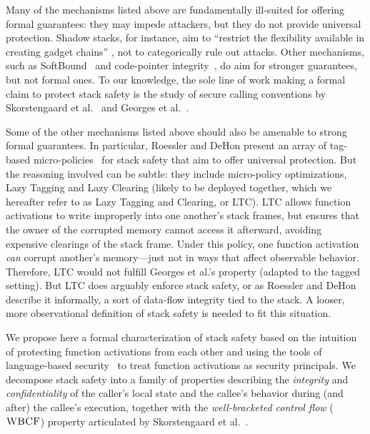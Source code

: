 \documentclass[10pt,conference]{ieeetran}%
\theoremstyle{definition}
\begin{document}
Many of the mechanisms listed above are fundamentally ill-suited for
offering formal guarantees: they may impede attackers, but they do not provide
universal protection. Shadow stacks, for instance, aim to ``restrict
the flexibility available in creating gadget chains''
\cite{Shanbhogue+19}, not to categorically rule out attacks. Other
mechanisms, such as SoftBound~\cite{NagarakatteZMZ09} and code-pointer
integrity~\cite{Kuznetsov+14}, do aim for stronger guarantees, but not
formal ones.  To our knowledge, the sole
line of work making a formal claim to protect stack safety is the
study of secure calling conventions by Skorstengaard et
al.~\cite{SkorstengaardSTKJFP} and Georges et
al.~\cite{Georges22:TempsDesCerises}.

Some of the other mechanisms listed above should also be amenable to strong
formal guarantees.  In particular, Roessler and DeHon
\cite{DBLP:conf/sp/RoesslerD18} present an array of tag-based
micro-policies~\cite{pump_oakland2015} for stack safety that aim to offer
universal protection.  But the reasoning involved can be subtle:
they include micro-policy optimizations, Lazy Tagging and Lazy Clearing
(likely to be deployed together, which we hereafter refer to as Lazy
Tagging and Clearing, or LTC). LTC allows function activations to write
improperly into one another's stack frames, but ensures that the owner of
the corrupted memory cannot access it afterward, avoiding expensive
clearings of the stack frame.
%
Under this policy, one function activation {\em can} corrupt another's
memory---just not in ways that affect observable behavior.
Therefore, LTC would not fulfill Georges et al.'s property
(adapted to the tagged setting).  But LTC does arguably enforce stack safety,
or as Roessler and DeHon describe it informally, a sort of data-flow
integrity tied to the stack. A looser, more observational
definition of stack safety is needed to fit this situation.

We propose here a formal characterization of stack safety based on
the intuition of protecting function activations from each other and
using the tools of language-based
security~\cite{sabelfeld2003language} to treat function activations as
security principals.  We decompose stack safety into a family of
properties describing
the {\em integrity} and {\em confidentiality} of the caller’s local state
and the callee's behavior during (and after) the callee's execution,
together with the
{\em well-bracketed control flow} (\(\textnormal{\sc WBCF}\)) property articulated by
Skorstengaard et al.~\cite{SkorstengaardSTKJFP}.
\end{document}
